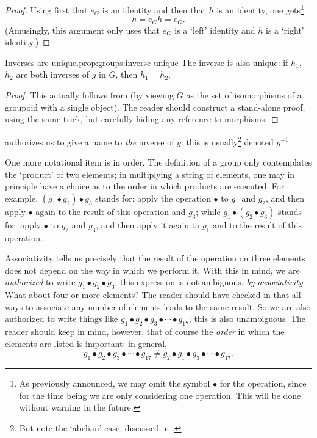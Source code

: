 \begin{proof}
  Using first that $e_G$ is an identity and then that $h$ is an
  identity, one gets\footnote{As previously announced, we may omit the
    symbol $\bullet$ for the operation, since for the time being we
    are only considering one operation. This will be done without
    warning in the future.}
  \[
    h = e_G h = e_G.
  \]
  (Amusingly, this argument only uses that $e_G$ is a `left' identity
  and $h$ is a `right' identity.)
\end{proof}
\begin{prop}{Inverses are unique.}{prop:groups:inverse-unique}
  The inverse is also unique: if $h_1$, $h_2$ are both inverses of $g$
  in $G$, then $h_1 = h_2$.
\end{prop}
\begin{proof}
  This actually follows from 
  (by viewing $G$ as the set of isomorphisms of a groupoid with a
  single object). The reader should construct a stand-alone proof,
  using the same trick, but carefully hiding any reference to
  morphisms.
\end{proof}
 authorizes us to give a name to
\emph{the} inverse of $g$: this is usually\footnote{But note the
  `abelian' case, discussed in
  .} denoted $g^{-1}$.

One more notational item is in order. The definition of a group only
contemplates the `product' of two elements; in multiplying a string of
elements, one may in principle have a choice as to the order in which
products are executed. For example, $(g_1 \bullet g_2) \bullet g_3$
stands for: apply the operation $\bullet$ to $g_1$ and $g_2$, and then
apply $\bullet$ again to the result of this operation and $g_3$; while
$g_1 \bullet (g_2 \bullet g_3)$ stands for: apply $\bullet$ to $g_2$
and $g_3$, and then apply it again to $g_1$ and to the result of this
operation.

Associativity tells us precisely that the result of the operation on
three elements does not depend on the way in which we perform it. With
this in mind, we are \emph{authorized} to write
$g_1 \bullet g_2 \bullet g_3$; this expression is not ambiguous,
\emph{by associativity}. What about four or more elements? The reader
should have checked in  that all ways
to associate any number of elements leads to the same result. So we
are also authorized to write things like
$g_1 \bullet g_2 \bullet g_3 \bullet \cdots \bullet g_{17}$; this is
also unambiguous. The reader should keep in mind, however, that of
course the \emph{order} in which the elements are listed is important:
in general,
\[
  g_1 \bullet g_2 \bullet g_3 \bullet \cdots \bullet g_{17} \neq g_2
  \bullet g_1 \bullet g_3 \bullet \cdots \bullet g_{17}.
\]

